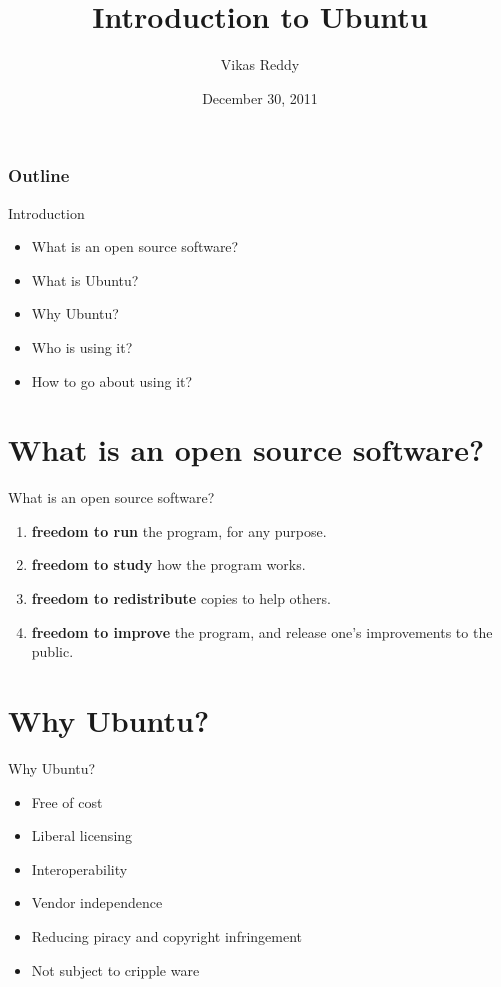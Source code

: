 \documentclass{beamer}
\title{Introduction to Ubuntu}
\author{Vikas Reddy}
\institute[Azri]{Azri Solutions}
\date{December 30, 2011}
\begin{document}
 \begin{frame}
  \titlepage
 \end{frame}

 \begin{frame}
  \frametitle{Outline}
  \tableofcontents
 \end{frame}

 \begin{frame}{Introduction}
  \begin{itemize}
   \item What is an open source software?
   \item What is Ubuntu?
   \item Why Ubuntu?
   \item Who is using it?
   \item How to go about using it?
  \end{itemize}
 \end{frame}

 \section{What is an open source software?}
 \begin{frame}{What is an open source software?}
  \begin{enumerate}
   \item \textbf{freedom to run} the program, for any purpose.
   \pause
   \item \textbf{freedom to study} how the program works.
   \pause
   \item \textbf{freedom to redistribute} copies to help others.
   \pause
   \item \textbf{freedom to improve} the program, and release one's improvements to the public.
  \end{enumerate}
 \end{frame}

 \section{Why Ubuntu?}
 \begin{frame}{Why Ubuntu?}
  \begin{itemize}
   \item Free of cost
   \pause
   \item Liberal licensing
   \pause
   \item Interoperability
   \pause
   \item Vendor independence
   \pause
   \item Reducing piracy and copyright infringement
   \pause
   \item Not subject to cripple ware
  \end{itemize}
 \end{frame}
\end{document}

